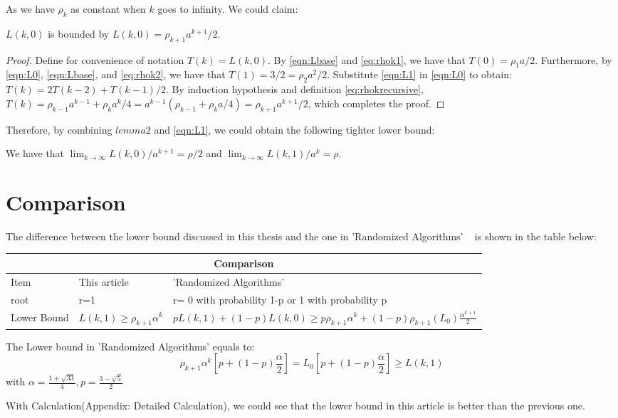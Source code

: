 As we have $\rho_{k}$ as constant when $k$ goes to infinity. We could claim:
\begin{lemma}
	$L(k, 0)$ is bounded by $L(k, 0) = \rho_{k+1} a^{k+1} / 2$.
\end{lemma}

\begin{proof}
	Define for convenience of notation $T(k) = L(k, 0)$.
	By \eqref{eqn:Lbase} and \eqref{eq:rhok1}, 
	we have that $T(0) = \rho_1 a / 2$.
	Furthermore, by \eqref{eqn:L0}, \eqref{eqn:Lbase}, and \eqref{eq:rhok2},
	we have that $T(1) = 3 /2 = \rho_2 a^2 / 2$.
	Substitute \eqref{eqn:L1} in \eqref{eqn:L0} to obtain:
	$T(k) = 2 T(k-2) + T(k-1) / 2$.
	By induction hypothesis and definition \eqref{eq:rhokrecursive},
	$T(k) = \rho_{k-1} a^{k-1} + \rho_k a^k / 4 
	= a^{k-1} \left( \rho_{k-1} + \rho_k a / 4 \right)
	= \rho_{k+1} a^{k+1} / 2$,
	which completes the proof.
\end{proof}

  Therefore, by combining $lemma 2$ and  \eqref{eqn:L1}, we could obtain the following tighter lower bound:
  
  \begin{theorem}
  	We have that 
  	$\lim_{k \rightarrow \infty} L(k, 0) / a^{k+1} = \rho / 2$
  	and
  	$\lim_{k \rightarrow \infty} L(k, 1) / a^k = \rho$.
  \end{theorem}

\section{Comparison}

The difference between the lower bound discussed in this thesis and the one in 'Randomized Algorithms' ~\cite{MR} is shown in the table below:

\begin{tabular}{ |p{3cm}||p{5cm}|p{5cm}|  }
	\hline
	\multicolumn{3}{|c|}{Comparison} \\
	\hline
	Item & This article & 'Randomized Algorithms'\\
	\hline
	root   & r=1    & r= 0 with probability 1-p or 1 with probability p\\
	\hline
	Lower Bound&   $L(k,1)\ge\rho_{k+1}\alpha^k$  & $pL(k,1)+(1-p)L(k,0)\ge p\rho_{k+1}\alpha^k+(1-p)\rho_{k+1}(L_0)\frac{\alpha^{k+1}}{2}$\\
	\hline
\end{tabular}
\newline
The Lower bound in 'Randomized Algorithms' equals to:
$$\rho_{k+1}\alpha^k[p+(1-p)\frac{\alpha}{2}]=L_0[p+(1-p)\frac{\alpha}{2}]\ge L(k,1)$$
with $\alpha=\frac{1+\sqrt{33}}{4}, p=\frac{3-\sqrt{5}}{2}$

With Calculation(Appendix: Detailed Calculation), we could see that the lower bound in this article is better than the previous one. 